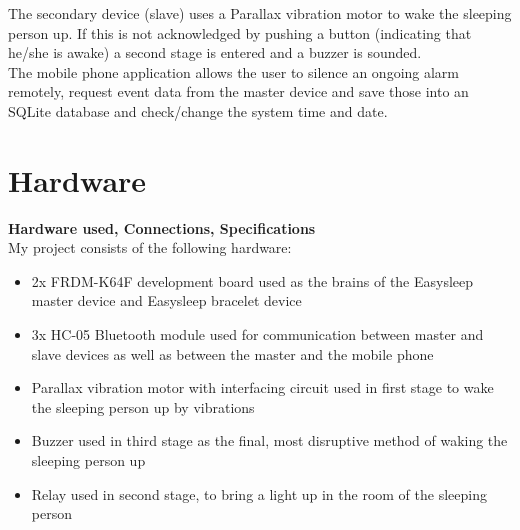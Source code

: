 \documentclass[12pt,a4paper]{article}
\begin{document}
	The secondary device (slave) uses a Parallax vibration motor to wake the sleeping person up. 
	If this is not acknowledged by pushing a button (indicating that he/she is awake) a second stage is entered and a buzzer is sounded.\\
	
	The mobile phone application allows the user to silence an ongoing alarm remotely, request 
	event data from the master device and save those into an SQLite database and check/change the 
	system time and date.\\
	\newpage
	
	\section{Hardware}
	{\bfseries Hardware used, Connections, Specifications}\\
	
	My project consists of the following hardware:
	
	\begin{itemize}
	 \item 2x FRDM-K64F development board used as the brains of the Easysleep master device and Easysleep bracelet device
	 \item 3x HC-05 Bluetooth module used for communication between master and slave devices as well as between the master and the mobile phone
	 \item Parallax vibration motor with interfacing circuit used in first stage to wake the sleeping person up by vibrations
	 \item Buzzer used in third stage as the final, most disruptive method of waking the sleeping  person up
	 \item Relay used in second stage, to bring a light up in the room of the sleeping person
	\end{itemize}
\end{document}
